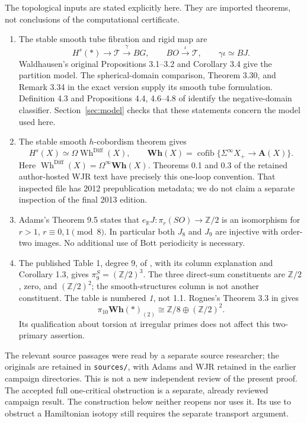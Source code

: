\documentclass[11pt]{article}
\theoremstyle{remark}
\newcommand{\R}{\mathbb R}
\newcommand{\Z}{\mathbb Z}
\newcommand{\T}{\mathcal T}
\newcommand{\Hs}{H^s}
\newcommand{\Wh}{\operatorname{Wh}^{\mathrm{Diff}}}
\begin{document}
The topological inputs are stated explicitly here. They are imported
theorems, not conclusions of the computational certificate.
\begin{enumerate}
\item The stable smooth tube fibration and rigid map are
\[
 \Hs(*)\longrightarrow\T\xrightarrow{\gamma}BG,\qquad
 BO\xrightarrow{\iota}\T,\qquad \gamma\iota\simeq BJ.
 \tag{T}
\]
Waldhausen's original Propositions 3.1--3.2 and Corollary 3.4
\cite{Waldhausen} give the partition model. The spherical-domain
comparison, Theorem 3.30, and Remark 3.34 in the exact version
\cite{AGIS} supply its smooth tube formulation.
Definition 4.3 and Propositions 4.4, 4.6--4.8 of \cite{AAGCK}
identify the negative-domain classifier. Section~\ref{sec:model}
checks that these statements concern the model used here.
\item The stable smooth \(h\)-cobordism theorem gives
\[
 \Hs(X)\simeq\Omega\Wh(X),\qquad
 \mathbf{Wh}(X)=\operatorname{cofib}
        \{\Sigma^\infty X_+\longrightarrow\mathbf A(X)\}.
 \tag{W}
\]
Here \(\Wh(X)=\Omega^\infty\mathbf{Wh}(X)\).
Theorems 0.1 and 0.3 of the retained author-hosted WJR text
\cite{WJR} have precisely this one-loop convention. That inspected
file has 2012 prepublication metadata; we do not claim a separate
inspection of the final 2013 edition.
\item Adams's Theorem 9.5 \cite{Adams} states that
\(e_{\R}J:\pi_r(SO)\to\Z/2\) is an isomorphism for
\(r>1\), \(r\equiv0,1\pmod8\). In particular both \(J_8\) and \(J_9\)
are injective with order-two images. No additional use of Bott
periodicity is necessary.
\item The published Table 1, degree 9, of \cite{IWX}, with its
column explanation and Corollary 1.3, gives
\(\pi_9^S=(\Z/2)^3\). The three direct-sum constituents are
\(\Z/2\), zero, and \((\Z/2)^2\); the smooth-structures column is
not another constituent. The table is numbered \emph{1}, not 1.1.
Rognes's Theorem 3.3 in \cite{Rognes} gives
\[
  \pi_{10}\mathbf{Wh}(*)_{(2)}
       \cong \Z/8\oplus(\Z/2)^2.
 \tag{G}
\]
Its qualification about torsion at irregular primes does not affect
this two-primary assertion.
\end{enumerate}
The relevant source passages were read by a separate source researcher;
the originals are retained in \texttt{sources/}, with Adams and WJR
retained in the earlier campaign directories. This is not a new
independent review of the present proof. The accepted full one-critical
obstruction is a separate, already reviewed campaign result. The
construction below neither reopens nor uses it. Its use to obstruct a
Hamiltonian isotopy still requires the separate transport argument.
\end{document}
